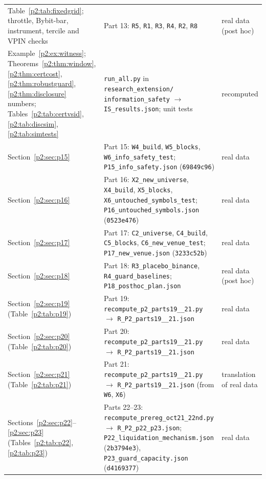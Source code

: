 \begin{longtable}{p{}p{}p{}}
Table~\ref{p2:tab:fixedgrid}; throttle, Bybit-bar, instrument, tercile and VPIN checks & Part 13: \texttt{R5}, \texttt{R1}, \texttt{R3}, \texttt{R4}, \texttt{R2}, \texttt{R8} & real data (post hoc)\\
Example~\ref{p2:ex:witness}; Theorems~\ref{p2:thm:window}, \ref{p2:thm:certcost}, \ref{p2:thm:robustguard}, \ref{p2:thm:disclosure} numbers; Tables~\ref{p2:tab:certvsid}, \ref{p2:tab:discsim}, \ref{p2:tab:simtests} & \texttt{run\_all.py} in \texttt{research\_extension/} \texttt{information\_safety} $\to$ \texttt{IS\_results.json}; unit tests & recomputed\\
Section~\ref{p2:sec:p15} & Part 15: \texttt{W4\_build}, \texttt{W5\_blocks}, \texttt{W6\_info\_safety\_test}; \texttt{P15\_info\_safety.json} (\texttt{69849c96}) & real data\\
Section~\ref{p2:sec:p16} & Part 16: \texttt{X2\_new\_universe}, \texttt{X4\_build}, \texttt{X5\_blocks}, \texttt{X6\_untouched\_symbols\_test}; \texttt{P16\_untouched\_symbols.json} (\texttt{0523e476}) & real data\\
Section~\ref{p2:sec:p17} & Part 17: \texttt{C2\_universe}, \texttt{C4\_build}, \texttt{C5\_blocks}, \texttt{C6\_new\_venue\_test}; \texttt{P17\_new\_venue.json} (\texttt{3233c52b}) & real data\\
Section~\ref{p2:sec:p18} & Part 18: \texttt{R3\_placebo\_binance}, \texttt{R4\_guard\_baselines}; \texttt{P18\_posthoc\_plan.json} & real data (post hoc)\\
Section~\ref{p2:sec:p19} (Table~\ref{p2:tab:p19}) & Part 19: \texttt{recompute\_\allowbreak p2\_\allowbreak parts19\_\allowbreak 20\_\allowbreak 21.py} $\to$ \texttt{R\_P2\_\allowbreak parts19\_\allowbreak 20\_\allowbreak 21.json} & real data\\
Section~\ref{p2:sec:p20} (Table~\ref{p2:tab:p20}) & Part 20: \texttt{recompute\_\allowbreak p2\_\allowbreak parts19\_\allowbreak 20\_\allowbreak 21.py} $\to$ \texttt{R\_P2\_\allowbreak parts19\_\allowbreak 20\_\allowbreak 21.json} & real data\\
Section~\ref{p2:sec:p21} (Table~\ref{p2:tab:p21}) & Part 21: \texttt{recompute\_\allowbreak p2\_\allowbreak parts19\_\allowbreak 20\_\allowbreak 21.py} $\to$ \texttt{R\_P2\_\allowbreak parts19\_\allowbreak 20\_\allowbreak 21.json} (from \texttt{W6}, \texttt{X6}) & translation of real data\\
Sections~\ref{p2:sec:p22}--\ref{p2:sec:p23} (Tables~\ref{p2:tab:p22}, \ref{p2:tab:p23}) & Parts 22--23: \texttt{recompute\_\allowbreak prereg\_\allowbreak oct21\_\allowbreak 22nd.py} $\to$ \texttt{R\_P2\_\allowbreak p22\_\allowbreak p23.json}; \texttt{P22\_\allowbreak liquidation\_\allowbreak mechanism.json} (\texttt{2b3794e3}), \texttt{P23\_\allowbreak guard\_\allowbreak capacity.json} (\texttt{d4169377}) & real data\\

\end{longtable}
